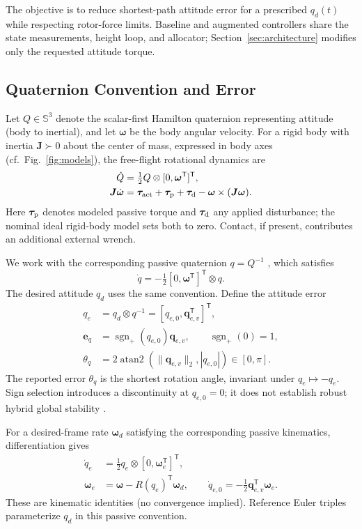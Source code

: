\documentclass[letterpaper, 10 pt, conference]{ieeeconf}
\newcommand{\T}{^{\mathsf T}}
\newcommand{\sgnp}{\operatorname{sgn}_{+}}
\begin{document}
The objective is to reduce shortest-path attitude error for a prescribed
$q_d(t)$ while respecting rotor-force limits. Baseline and augmented
controllers share the state measurements, height loop, and allocator;
Section~\ref{sec:architecture} modifies only the requested attitude torque.

%

\subsection{Quaternion Convention and Error}
Let $Q\in\mathbb S^3$ denote the scalar-first Hamilton quaternion representing attitude (body to inertial), and let $\bm\omega$ be the body angular velocity. For a rigid body with inertia $\bm J\succ0$ about the center of mass, expressed in body axes (cf.~Fig.~\ref{fig:models}), the free-flight rotational dynamics are \cite{schaub2018amss}
\begin{align}
 \dot Q&=\tfrac12 Q\otimes[0,\bm\omega\T]\T,\\
 \bm J\dot{\bm\omega}&=\bm\tau_{\rm act}+\bm\tau_{\rm p}
       +\bm\tau_{\rm d}-\bm\omega\times(\bm J\bm\omega).
 \label{eq:plant}
\end{align}
Here $\bm\tau_{\rm p}$ denotes modeled passive torque and $\bm\tau_{\rm d}$ any applied disturbance; the nominal ideal rigid-body model sets both to zero. Contact, if present, contributes an additional external wrench.

We work with the corresponding passive quaternion $q=Q^{-1}$ \cite{diebel2006quaternion}, which satisfies
\begin{equation}
 \dot q=-\tfrac12[0,\bm\omega\T]\T\otimes q.
 \label{eq:passive}
\end{equation}
The desired attitude $q_d$ uses the same convention. Define the attitude error
\begin{align}
 q_e&=q_d\otimes q^{-1}=[q_{e,0},\bm q_{e,v}\T]\T,\\
 \bm e_q&=\sgnp(q_{e,0})\bm q_{e,v},\qquad \sgnp(0)=1,\\
 \theta_q&=2\operatorname{atan2}(\|\bm q_{e,v}\|_2,|q_{e,0}|)
             \in[0,\pi].
 \label{eq:theta}
\end{align}
The reported error $\theta_q$ is the shortest rotation angle, invariant under $q_e\mapsto-q_e$. Sign selection introduces a discontinuity at $q_{e,0}=0$; it does not establish robust hybrid global stability \cite{mayhew2011hybrid}.

For a desired-frame rate $\bm\omega_d$ satisfying the corresponding passive kinematics, differentiation gives
\begin{align}
 \dot q_e&=\tfrac12q_e\otimes[0,\bm\omega_e\T]\T,\\
 \bm\omega_e&=\bm\omega-R(q_e)\T\bm\omega_d,\qquad
 \dot q_{e,0}=-\tfrac12\bm q_{e,v}\T\bm\omega_e.
 \label{eq:errkin}
\end{align}
These are kinematic identities (no convergence implied). Reference Euler triples parameterize $q_d$ in this passive convention.
\end{document}

